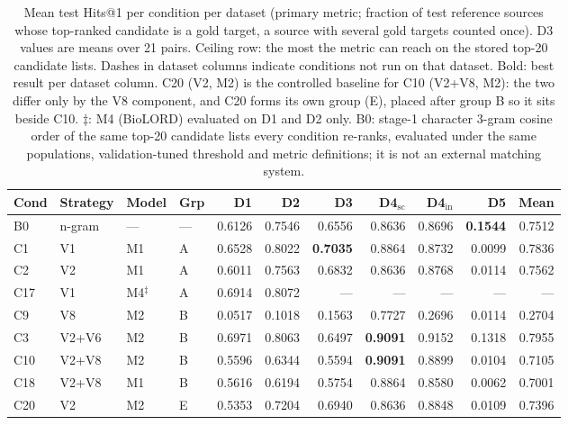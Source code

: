 \begin{table}[t]
\scriptsize
\setlength{\tabcolsep}{4pt}
\begin{threeparttable}
\caption{Mean test Hits@1 per condition per dataset (primary metric; fraction of test reference sources whose top-ranked candidate is a gold target, a source with several gold targets counted once). D3 values are means over 21 pairs. Ceiling row: the most the metric can reach on the stored top-20 candidate lists. Dashes in dataset columns indicate conditions not run on that dataset. Bold: best result per dataset column. C20 (V2, M2) is the controlled baseline for C10 (V2+V8, M2): the two differ only by the V8 component, and C20 forms its own group (E), placed after group B so it sits beside C10. $\ddagger$: M4 (BioLORD) evaluated on D1 and D2 only. B0: stage-1 character 3-gram cosine order of the same top-20 candidate lists every condition re-ranks, evaluated under the same populations, validation-tuned threshold and metric definitions; it is not an external matching system.}
\label{tab:ranking_hits_at_1}
\begin{tabular}{llllrrrrrrr}
\hline
\textbf{Cond} & \textbf{Strategy} & \textbf{Model} & \textbf{Grp} & \textbf{D1} & \textbf{D2} & \textbf{D3} & \textbf{D4$_{\mathrm{sc}}$} & \textbf{D4$_{\mathrm{in}}$} & \textbf{D5} & \textbf{Mean\tnote{*}} \\
\hline
B0 & n-gram & --- & --- & 0.6126 & 0.7546 & 0.6556 & 0.8636 & 0.8696 & \textbf{0.1544} & 0.7512 \\
\hline
C1 & V1 & M1 & A & 0.6528 & 0.8022 & \textbf{0.7035} & 0.8864 & 0.8732 & 0.0099 & 0.7836 \\
C2 & V2 & M1 & A & 0.6011 & 0.7563 & 0.6832 & 0.8636 & 0.8768 & 0.0114 & 0.7562 \\
C17 & V1 & M4$^\ddagger$ & A & 0.6914 & 0.8072 & --- & --- & --- & --- & --- \\
\hline
C9 & V8 & M2 & B & 0.0517 & 0.1018 & 0.1563 & 0.7727 & 0.2696 & 0.0114 & 0.2704 \\
C3 & V2+V6 & M2 & B & 0.6971 & 0.8063 & 0.6497 & \textbf{0.9091} & 0.9152 & 0.1318 & 0.7955 \\
C10 & V2+V8 & M2 & B & 0.5596 & 0.6344 & 0.5594 & \textbf{0.9091} & 0.8899 & 0.0104 & 0.7105 \\
C18 & V2+V8 & M1 & B & 0.5616 & 0.6194 & 0.5754 & 0.8864 & 0.8580 & 0.0062 & 0.7001 \\
\hline
C20 & V2 & M2 & E & 0.5353 & 0.7204 & 0.6940 & 0.8636 & 0.8848 & 0.0109 & 0.7396 \\
\hline

\end{tabular}
\end{threeparttable}
\end{table}
